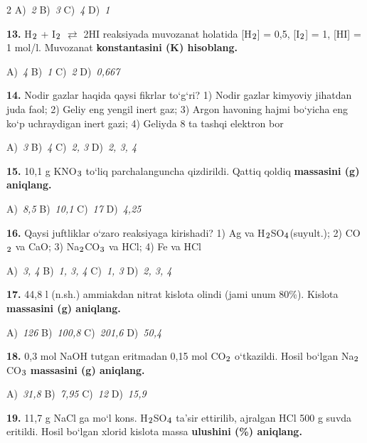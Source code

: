 \documentclass[11pt,a4paper]{article}
\renewcommand{\textsubscript}[1]{\ensuremath{_{\text{\fontsize{8}{8}\selectfont #1}}}}
\begin{document}
\begin{multicols}{2}
\noindent A)~\textsl{2} \hfill B)~\textsl{3} \hfill C)~\textsl{4} \hfill D)~\textsl{1}\par
\vspace{4pt}
\noindent\textbf{13.} H\textsubscript{2} + I\textsubscript{2} $\rightleftarrows$ 2HI reaksiyada muvozanat holatida [H\textsubscript{2}] = 0,5, [I\textsubscript{2}] = 1, [HI] = 1 mol/l. Muvozanat \textbf{konstantasini (K) hisoblang.}

\noindent A)~\textsl{4} \hfill B)~\textsl{1} \hfill C)~\textsl{2} \hfill D)~\textsl{0,667}\par
\vspace{4pt}
\noindent\textbf{14.} Nodir gazlar haqida qaysi fikrlar to`g`ri? 1) Nodir gazlar kimyoviy jihatdan juda faol; 2) Geliy eng yengil inert gaz; 3) Argon havoning hajmi bo`yicha eng ko`p uchraydigan inert gazi; 4) Geliyda 8 ta tashqi elektron bor

\noindent A)~\textsl{3} \hfill B)~\textsl{4} \hfill C)~\textsl{2, 3} \hfill D)~\textsl{2, 3, 4}\par
\vspace{4pt}
\noindent\textbf{15.} 10,1 g KNO\textsubscript{3} to`liq parchalanguncha qizdirildi. Qattiq qoldiq \textbf{massasini (g) aniqlang.}

\noindent A)~\textsl{8,5} \hfill B)~\textsl{10,1} \hfill C)~\textsl{17} \hfill D)~\textsl{4,25}\par
\vspace{4pt}
\noindent\textbf{16.} Qaysi juftliklar o`zaro reaksiyaga kirishadi? 1) Ag va H\textsubscript{2}SO\textsubscript{4}(suyult.); 2) CO\textsubscript{2} va CaO; 3) Na\textsubscript{2}CO\textsubscript{3} va HCl; 4) Fe va HCl

\noindent A)~\textsl{3, 4} \hfill B)~\textsl{1, 3, 4} \hfill C)~\textsl{1, 3} \hfill D)~\textsl{2, 3, 4}\par
\vspace{4pt}
\noindent\textbf{17.} 44,8 l (n.sh.) ammiakdan nitrat kislota olindi (jami unum 80\%). Kislota \textbf{massasini (g) aniqlang.}

\noindent A)~\textsl{126} \hfill B)~\textsl{100,8} \hfill C)~\textsl{201,6} \hfill D)~\textsl{50,4}\par
\vspace{4pt}
\noindent\textbf{18.} 0,3 mol NaOH tutgan eritmadan 0,15 mol CO\textsubscript{2} o`tkazildi. Hosil bo`lgan Na\textsubscript{2}CO\textsubscript{3} \textbf{massasini (g) aniqlang.}

\noindent A)~\textsl{31,8} \hfill B)~\textsl{7,95} \hfill C)~\textsl{12} \hfill D)~\textsl{15,9}\par
\vspace{4pt}
\noindent\textbf{19.} 11,7 g NaCl ga mo`l kons. H\textsubscript{2}SO\textsubscript{4} ta'sir ettirilib, ajralgan HCl 500 g suvda eritildi. Hosil bo`lgan xlorid kislota massa \textbf{ulushini (\%) aniqlang.}


\end{multicols}
\end{document}
